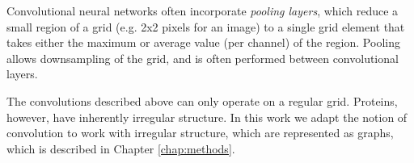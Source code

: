 Convolutional neural networks often incorporate \textit{pooling layers}, which reduce a small region of a grid (e.g. 2x2 pixels for an image) to a single grid element that takes either the maximum or average value (per channel) of the region. 
Pooling allows downsampling of the grid, and is often performed between convolutional layers. 

The convolutions described above can only operate on a regular grid. 
Proteins, however, have inherently irregular structure. 
In this work we adapt the notion of convolution to work with irregular structure, which are represented as graphs, which is described in Chapter \ref{chap:methods}.





